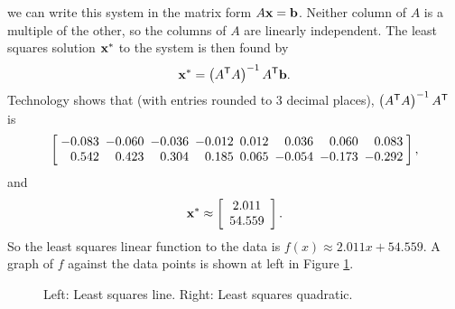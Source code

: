 \begin{example}
we can write this system in the matrix form  $A \mathbf{x} = \mathbf{b}$. Neither column of $A$ is a multiple of the other, so the columns of $A$ are linearly independent. The least squares solution $\mathbf{x}^*$ to the system is then found by 
\[\mathbf{x}^* = \left(A^{\mathsf{T}}A\right)^{-1}A^{\mathsf{T}} \mathbf{b}.\]
Technology shows that (with entries rounded to 3 decimal places), $\left(A^{\mathsf{T}}A\right)^{-1}A^{\mathsf{T}}$ is 
\[ \left[\arraycolsep=2.5pt \begin{array}{rrrrcrrr} - 0.083&- 0.060&- 0.036&- 0.012& 0.012& 0.036& 0.060& 0.083\\ 0.542& 0.423& 0.304& 0.185& 0.065&- 0.054&- 0.173&- 0.292 \end{array} \right],\]
and 
\[\mathbf{x}^* \approx \left[ \begin{array}{cc} 2.011 \\ 54.559 \end{array} \right].\]
So the least squares linear function to the data is $f(x) \approx 2.011x + 54.559$. A graph of $f$ against the data points is shown at left in Figure \ref{F:LS_linear}. 
\begin{figure}[h]
\begin{center}
\end{center}
\caption{Left: Least squares line. Right: Least squares quadratic.}
\label{F:LS_linear}
\end{figure}   
		

\end{example}
